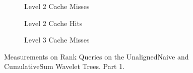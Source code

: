 \begin{figure}
\begin{subfigure}{0.30\textwidth}
	
	\caption{Level 2 Cache Misses}
	\label{fig:CumulativeSumRankL2CM}
\end{subfigure}
\hfill
\begin{subfigure}{0.30\textwidth}
	
\caption{Level 2 Cache Hits}
\label{fig:CumulativeSumRankL2CHits}
\end{subfigure}
\hfill
%	
\begin{subfigure}{0.30\textwidth}
	
	\caption{Level 3 Cache Misses}
	\label{fig:CumulativeSumRankL3CM}
\end{subfigure}

\caption{Measurements on Rank Queries on the UnalignedNaive and CumulativeSum Wavelet Trees. Part 1.}
\label{fig:CumulativeSumRank}
\end{figure}





\clearpage




